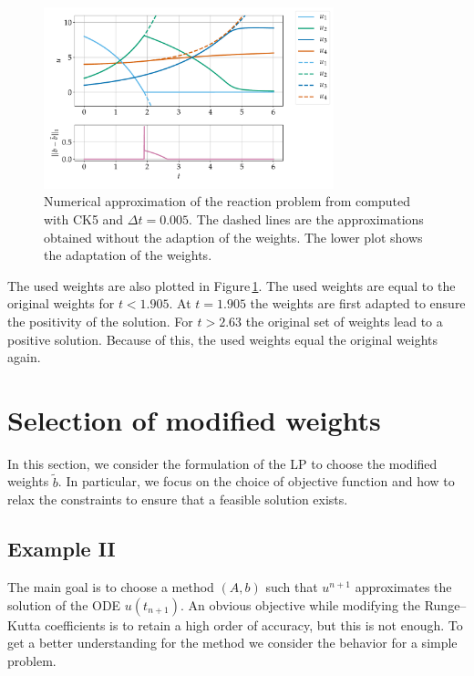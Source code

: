\documentclass[a4paper]{article}
\numberwithin{equation}{section}
\theoremstyle{plain}
\theoremstyle{definition}
\numberwithin{theorem}{section}
\newcommand{\dt}{{\Delta t}}
\newcommand{\1}{\mathbbm{1}}
\newcommand{\bt}{\tilde{b}}
\begin{document}
\begin{figure}[ht]
    \centering
    \includegraphics[width=0.75\textwidth]{plots/exampleI.pdf}
    \caption{Numerical approximation of the reaction problem from \cite{kopecz_comparison_2019} computed with CK5 and $\dt = 0.005$. The dashed lines are the approximations obtained without the adaption of the weights. The lower plot shows the adaptation of the weights. }
    \label{fig:exampleI}
\end{figure}

The used weights are also plotted in Figure\,\ref{fig:exampleI}. 
The used weights are equal to the original weights for $t<1.905$. At $t=1.905$ the weights are first adapted to ensure the positivity of the solution. For $t>2.63$ the original set of weights lead to a positive solution. Because of this, the used weights equal the original weights again.


\section{Selection of modified weights}\label{sec:LP}

In this section, we consider the formulation of the LP to choose
the modified weights $\bt$.  In particular, we focus on the choice
of objective function and how to relax the constraints to ensure that
a feasible solution exists.

\subsection{Example II}\label{sec:example_lin}

The main goal is to choose a method $(A,b)$ such that $u^{n+1}$
approximates the solution of the ODE $u(t_{n+1})$.
An obvious objective while modifying the Runge--Kutta coefficients
is to retain a high order of accuracy, but this is not enough.
To get a better understanding for the method we consider the
behavior for a simple problem.
\end{document}
